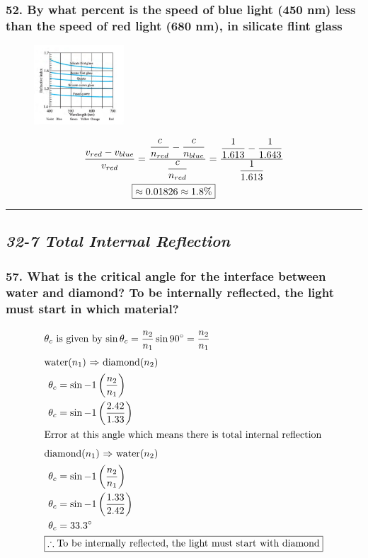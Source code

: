 \documentclass{article}
\newcommand{\spc}{\vspace{1em}\hrule\vspace{1em}}
\newcommand{\bp}[1]{\left(#1\right)}
\begin{document}
\subsubsection*{
    52. By what percent is the speed of blue light (450 nm) less than the speed of
    red light (680 nm), in silicate flint glass
} 
\begin{figure}[h]
    \begin{center}
        \includegraphics[width=0.3\textwidth]{figures/p52.jpg}
    \end{center}
\end{figure}
\begin{align*}
    \displaystyle\frac{v_{red}-v_{blue}}{v_{red}} &=
    \displaystyle\frac{\displaystyle\frac c
    {n_{red}}-\displaystyle\frac c {n_{blue}}}{\displaystyle\frac c {n_{red}}} =
    \displaystyle\frac{\displaystyle\frac{1}{1.613}-\displaystyle\frac{1}{1.643}}{\displaystyle\frac{1}{1.613}} \\
    \Aboxed{&\approx 0.01826 \approx 1.8\%}
\end{align*}
\spc
\begin{center}
    \subsection*{\textbf{\textit{32-7 Total Internal Reflection}}}
\end{center}
\subsubsection*{
    57. What is the critical angle for the interface between water and diamond?
    To be internally reflected, the light must start in which material?
}
\begin{align*}
    \intertext{$\theta_c$ is given by $\sin\theta_c = \displaystyle\frac {n_2}{n_1}\sin
    90\degree = \displaystyle\frac {n_2}{n_1}$}
    \intertext{water($n_1$) $\Rightarrow$ diamond($n_2$)}
    \theta_c &= \sin{-1}\bp{\displaystyle\frac{n_2}{n_1}} \\
    \theta_c &= \sin{-1}\bp{\displaystyle\frac{2.42}{1.33}} \\
    \intertext{Error at this angle which means there is total internal
    reflection}
    \intertext{diamond($n_1$) $\Rightarrow$ water($n_2$)}
    \theta_c &= \sin{-1}\bp{\displaystyle\frac{n_2}{n_1}} \\
    \theta_c &= \sin{-1}\bp{\displaystyle\frac{1.33}{2.42}} \\
    \theta_c &= 33.3\degree \\
    \Aboxed{\therefore &\text{To be internally reflected, the light must start
    with diamond}}
\end{align*}
\end{document}
